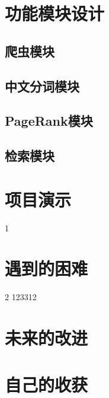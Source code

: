 \documentclass{ctexart}
\begin{document}
    \section{功能模块设计}\label{sec:modules}

    \subsection{爬虫模块}\label{subsec:crawl}

    \subsection{中文分词模块}\label{subsec:segment}

    \subsection{PageRank模块}\label{subsec:pagerank}

    \subsection{检索模块}\label{subsec:retrieve}


    \section{项目演示}\label{sec:demo}
    1


    \section{遇到的困难}\label{sec:difficulty}

    2\cite{pascal} 123312\cite{search-engine}


    \section{未来的改进}\label{sec:improvement}


    \section{自己的收获}\label{sec:achievement}

    
    
\end{document}
